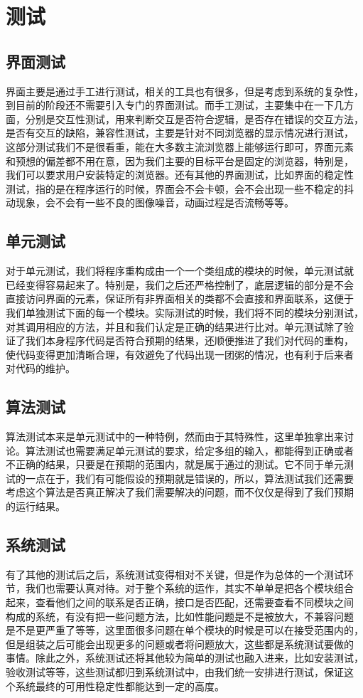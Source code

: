 \section{测试}
\subsection{界面测试}
界面主要是通过手工进行测试，相关的工具也有很多，但是考虑到系统的复杂性，
到目前的阶段还不需要引入专门的界面测试。而手工测试，主要集中在一下几方
面，分别是交互性测试，用来判断交互是否符合逻辑，是否存在错误的交互方法，
是否有交互的缺陷，兼容性测试，主要是针对不同浏览器的显示情况进行测试，
这部分测试我们不是很看重，能在大多数主流浏览器上能够运行即可，界面元素
和预想的偏差都不用在意，因为我们主要的目标平台是固定的浏览器，特别是，
我们可以要求用户安装特定的浏览器。还有其他的界面测试，比如界面的稳定性
测试，指的是在程序运行的时候，界面会不会卡顿，会不会出现一些不稳定的抖
动现象，会不会有一些不良的图像噪音，动画过程是否流畅等等。
\subsection{单元测试}
对于单元测试，我们将程序重构成由一个一个类组成的模块的时候，单元测试就
已经变得容易起来了。特别是，我们之后还严格控制了，底层逻辑的部分是不会
直接访问界面的元素，保证所有非界面相关的类都不会直接和界面联系，这便于
我们单独测试下面的每一个模块。实际测试的时候，我们将不同的模块分别测试，
对其调用相应的方法，并且和我们认定是正确的结果进行比对。单元测试除了验
证了我们本身程序代码是否符合预期的结果，还顺便推进了我们对代码的重构，
使代码变得更加清晰合理，有效避免了代码出现一团粥的情况，也有利于后来者
对代码的维护。
\subsection{算法测试}
算法测试本来是单元测试中的一种特例，然而由于其特殊性，这里单独拿出来讨
论。算法测试也需要满足单元测试的要求，给定多组的输入，都能得到正确或者
不正确的结果，只要是在预期的范围内，就是属于通过的测试。它不同于单元测
试的一点在于，我们有可能假设的预期就是错误的，所以，算法测试我们还需要
考虑这个算法是否真正解决了我们需要解决的问题，而不仅仅是得到了我们预期
的运行结果。
\subsection{系统测试}
有了其他的测试后之后，系统测试变得相对不关键，但是作为总体的一个测试环
节，我们也需要认真对待。对于整个系统的运作，其实不单单是把各个模块组合
起来，查看他们之间的联系是否正确，接口是否匹配，还需要查看不同模块之间
构成的系统，有没有把一些问题方法，比如性能问题是不是被放大，不兼容问题
是不是更严重了等等，这里面很多问题在单个模块的时候是可以在接受范围内的，
但是组装之后可能会出现更多的问题或者将问题放大，这些都是系统测试要做的
事情。除此之外，系统测试还将其他较为简单的测试也融入进来，比如安装测试，
验收测试等等，这些测试都归到系统测试中，由我们统一安排进行测试，保证这
个系统最终的可用性稳定性都能达到一定的高度。
